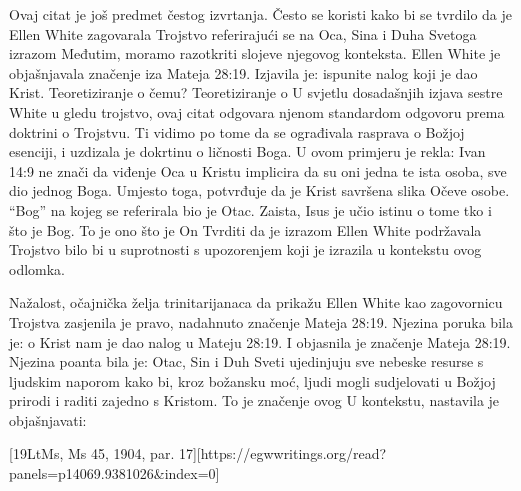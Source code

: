 Ovaj citat je još predmet čestog izvrtanja. Često se koristi kako bi se tvrdilo da je Ellen White zagovarala Trojstvo referirajući se na Oca, Sina i Duha Svetoga izrazom  Međutim, moramo razotkriti slojeve njegovog konteksta. Ellen White je objašnjavala značenje iza Mateja 28:19. Izjavila je:  ispunite nalog koji je dao Krist. Teoretiziranje o čemu? Teoretiziranje o  U svjetlu dosadašnjih izjava sestre White u gledu trojstvo, ovaj citat odgovara njenom standardom odgovoru prema doktrini o Trojstvu. Ti vidimo po tome da se ograđivala rasprava o Božjoj esenciji, i uzdizala je dokrtinu o ličnosti Boga. U ovom primjeru je rekla:  Ivan 14:9 ne znači da viđenje Oca u Kristu implicira da su oni jedna te ista osoba, sve dio jednog Boga. Umjesto toga, potvrđuje da je Krist savršena slika Očeve osobe. “Bog” na kojeg se referirala bio je Otac. Zaista, Isus je učio istinu o tome tko i što je Bog. To je ono što je On   Tvrditi da je izrazom  Ellen White podržavala Trojstvo bilo bi u suprotnosti s upozorenjem koji je izrazila u kontekstu ovog odlomka.

Nažalost, očajnička želja trinitarijanaca da prikažu Ellen White kao zagovornicu Trojstva zasjenila je pravo, nadahnuto značenje Mateja 28:19. Njezina poruka bila je:  o  Krist nam je dao nalog u Mateju 28:19. I objasnila je značenje Mateja 28:19. Njezina poanta bila je: Otac, Sin i Duh Sveti ujedinjuju sve nebeske resurse s ljudskim naporom kako bi, kroz božansku moć, ljudi mogli sudjelovati u Božjoj prirodi i raditi zajedno s Kristom. To je značenje ovog  U kontekstu, nastavila je objašnjavati:

[19LtMs, Ms 45, 1904, par. 17][https://egwwritings.org/read?panels=p14069.9381026&index=0]

